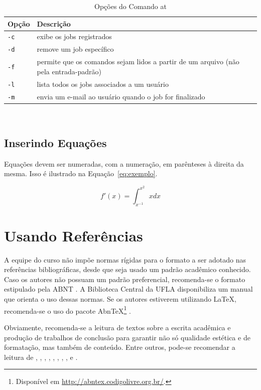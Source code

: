 \begin{table}[!htb]
\caption{Opções do Comando {\ttfamily at}}
\label{tab:maisum}
\begin{center}
  \small
  \begin{tabular}{l|p{9cm}}
    \hline 
    \rowcolor[gray]{.9}
    \bf Opção & \bf Descrição\\
    \hline
    \hline 
    \tt -c & exibe os jobs registrados\\
    \tt -d & remove um job específico\\
    \tt -f & permite que os comandos sejam lidos a partir de um arquivo (não pela
    entrada-padrão)\\
    \tt -l & lista todos os jobs associados a um usuário\\
    \tt -m & envia um e-mail ao usuário quando o job for finalizado\\
    \hline \end{tabular}\\
\end{center}
\end{table}

\subsection{Inserindo Equações}

Equações devem ser numeradas, com a numeração, em parênteses à direita da mesma. Isso é ilustrado na Equação~\ref{eq:exemplo}.

\begin{equation}
\label{eq:exemplo}
f'(x) = \int^{x^2}_{x^{-1}} xdx 
\end{equation}


\section{Usando Referências}
A equipe do curso não impõe normas rígidas para o formato a ser adotado nas referências bibliográficas, desde que seja usado um padrão acadêmico conhecido. Caso os autores não possuam um padrão preferencial, recomenda-se o formato estipulado pela ABNT \cite{NBR6023:2002}. A Biblioteca Central da UFLA disponibiliza um manual \cite{BIBUFLA2001} que orienta o uso dessas normas. Se os autores estiverem utilizando \LaTeX, recomenda-se o uso do pacote Abn\TeX\footnote{Disponível em \url{http://abntex.codigolivre.org.br/}.} \cite{Weber2003}. 

Obviamente, recomenda-se a leitura de textos sobre a escrita acadêmica e produção de trabalhos de conclusão para garantir não só qualidade estética e de formatação, mas também de conteúdo. Entre outros, pode-se recomendar a leitura de \cite{Silva2005}, \cite{Martins2000}, \cite{Gil2002}, \cite{Franca2001}, \cite{Eco1996}, \cite{Moura1998}, \cite{Booth2000}, \cite{Hexsel2004}, \cite{Porto2002} e \cite{Henz2003}. 

